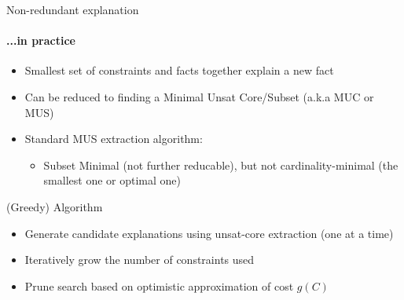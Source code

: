 \documentclass{beamer}
\begin{document}
\begin{frame}{Non-redundant explanation}
    \framesubtitle{...in practice}

    \begin{itemize}
        \item Smallest set of constraints and facts together explain a new fact
        \item Can be reduced to finding a Minimal Unsat Core/Subset (a.k.a MUC or MUS)
        \item Standard MUS extraction algorithm:
              \begin{itemize}
                  \item Subset Minimal (not further reducable), but not cardinality-minimal (the smallest one or optimal one)
              \end{itemize}
    \end{itemize}
\end{frame}

\begin{frame}{(Greedy) Algorithm}

    \begin{itemize}
            \item Generate candidate explanations using unsat-core extraction (one at a time)
            \item Iteratively grow the number of constraints used
            \item Prune search based on optimistic approximation of cost $g(C)$
    \end{itemize}
 
\end{frame}
\end{document}

